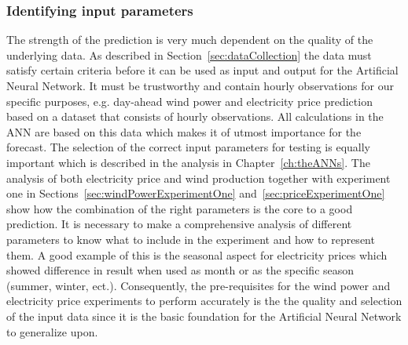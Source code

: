 \subsubsection{Identifying input parameters}
The strength of the prediction is very much dependent on the quality of the underlying data. As described in Section~\ref{sec:dataCollection} the data must satisfy certain criteria before it can be used as input and output for the Artificial Neural Network. It must be trustworthy and contain hourly observations for our specific purposes, e.g. day-ahead wind power and electricity price prediction based on a dataset that consists of hourly observations. All calculations in the ANN are based on this data which makes it of utmost importance for the forecast. The selection of the correct input parameters for testing is equally important which is described in the analysis in Chapter~\ref{ch:theANNs}. The analysis of both electricity price and wind production together with experiment one in Sections~\ref{sec:windPowerExperimentOne} and~\ref{sec:priceExperimentOne} show how the combination of the right parameters is the core to a good prediction. It is necessary to make a comprehensive analysis of different parameters to know what to include in the experiment and how to represent them. A good example of this is the seasonal aspect for electricity prices which showed difference in result when used as month or as the specific season (summer, winter, ect.). Consequently, the pre-requisites for the wind power and electricity price experiments to perform accurately is the the quality and selection of the input data since it is the basic foundation for the Artificial Neural Network to generalize upon. 


